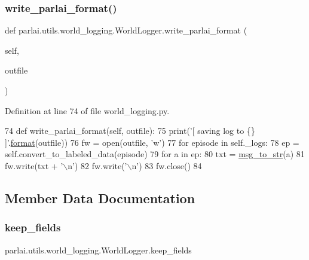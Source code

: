 \subsubsection{\texorpdfstring{write\+\_\+parlai\+\_\+format()}{write\_parlai\_format()}}
{\footnotesize\ttfamily def parlai.\+utils.\+world\+\_\+logging.\+World\+Logger.\+write\+\_\+parlai\+\_\+format (\begin{DoxyParamCaption}\item[{}]{self,  }\item[{}]{outfile }\end{DoxyParamCaption})}



Definition at line 74 of file world\+\_\+logging.\+py.


\begin{DoxyCode}
74     \textcolor{keyword}{def }write\_parlai\_format(self, outfile):
75         print(\textcolor{stringliteral}{'[ saving log to \{\} ]'}.\hyperlink{namespaceparlai_1_1chat__service_1_1services_1_1messenger_1_1shared__utils_a32e2e2022b824fbaf80c747160b52a76}{format}(outfile))
76         fw = open(outfile, \textcolor{stringliteral}{'w'})
77         \textcolor{keywordflow}{for} episode \textcolor{keywordflow}{in} self.\_logs:
78             ep = self.convert\_to\_labeled\_data(episode)
79             \textcolor{keywordflow}{for} a \textcolor{keywordflow}{in} ep:
80                 txt = \hyperlink{namespaceparlai_1_1utils_1_1misc_ae5db473b41d3b49814e2566e866282b6}{msg\_to\_str}(a)
81                 fw.write(txt + \textcolor{stringliteral}{'\(\backslash\)n'})
82             fw.write(\textcolor{stringliteral}{'\(\backslash\)n'})
83         fw.close()
84 
\end{DoxyCode}


\subsection{Member Data Documentation}
\mbox{\label{classparlai_1_1utils_1_1world__logging_1_1WorldLogger_afbcb1888545753a6bc9e272ab63e8218}} 
\subsubsection{\texorpdfstring{keep\+\_\+fields}{keep\_fields}}
{\footnotesize\ttfamily parlai.\+utils.\+world\+\_\+logging.\+World\+Logger.\+keep\+\_\+fields}



